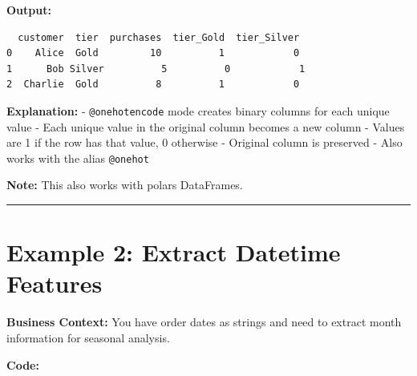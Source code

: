 \documentclass[
  letterpaper,
]{scrbook}
\begin{document}
\textbf{Output:}

\begin{verbatim}
  customer  tier  purchases  tier_Gold  tier_Silver
0    Alice  Gold         10          1            0
1      Bob Silver          5          0            1
2  Charlie  Gold          8          1            0
\end{verbatim}

\textbf{Explanation:} -
\texttt{\textquotesingle{}@onehotencode\textquotesingle{}} mode creates
binary columns for each unique value - Each unique value in the original
column becomes a new column - Values are 1 if the row has that value, 0
otherwise - Original column is preserved - Also works with the alias
\texttt{@onehot}

\textbf{Note:} This also works with polars DataFrames.

\begin{center}\rule{0.5\linewidth}{0.5pt}\end{center}

\section{Example 2: Extract Datetime
Features}\label{example-2-extract-datetime-features}

\textbf{Business Context:} You have order dates as strings and need to
extract month information for seasonal analysis.

\textbf{Code:}
\end{document}
